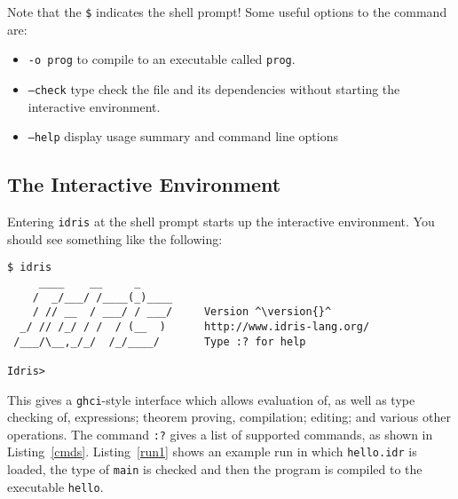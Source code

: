 \noindent
Note that the \texttt{\$} indicates the shell prompt! Some useful options to the \Idris{} command are:

\begin{itemize}
\item \texttt{-o prog} to compile to an executable called \texttt{prog}.
\item \texttt{--check} type check the file and its dependencies without starting the 
interactive environment.
\item \texttt{--help} display usage summary and command line options
\end{itemize}

\subsection{The Interactive Environment}

Entering \texttt{idris} at the shell prompt starts up the interactive environment.
You should see something like the following:

\begin{lstlisting}[style=stdout]
$ idris
     ____    __     _                                          
    /  _/___/ /____(_)____                                     
    / // __  / ___/ / ___/     Version ^\version{}^
  _/ // /_/ / /  / (__  )      http://www.idris-lang.org/      
 /___/\__,_/_/  /_/____/       Type :? for help      

Idris>
\end{lstlisting}

\noindent
This gives a \texttt{ghci}-style interface which allows evaluation of, as well as type checking of, expressions; theorem proving, compilation; editing; and various other operations.
The command \texttt{:?} gives a list of supported commands, as shown in Listing~\ref{cmds}.
Listing~\ref{run1} shows an example run in which \texttt{hello.idr} is loaded, the type of \texttt{main} is checked and then the program is compiled to the executable \texttt{hello}.

